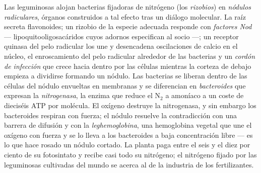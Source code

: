 \begin{definition}\label{def:b3:microbiomes:nodule}
Las leguminosas alojan bacterias fijadoras de nitrógeno (los
\emph{rizobios}) en \emph{nódulos radiculares}, órganos construidos a tal
efecto tras un diálogo molecular. La raíz secreta flavonoides; un rizobio
de la especie adecuada responde con \emph{factores Nod} ---
lipoquitooligosacáridos cuyos adornos especifican al socio ---; un
receptor quinasa del pelo radicular los une y desencadena oscilaciones de
calcio en el núcleo, el enroscamiento del pelo radicular alrededor de las
bacterias y un \emph{cordón de infección} que crece hacia dentro por las
células mientras la corteza de debajo empieza a dividirse formando un
nódulo. Las bacterias se liberan dentro de las células del nódulo
envueltas en membranas y se diferencian en \emph{bacteroides} que
expresan la \emph{nitrogenasa}, la enzima que reduce el N$_{2}$ a amoníaco
a un coste de dieciséis ATP por molécula. El oxígeno destruye la
nitrogenasa, y sin embargo los bacteroides respiran con fuerza; el nódulo
resuelve la contradicción con una barrera de difusión y con la
\emph{leghemoglobina}, una hemoglobina vegetal que une el oxígeno con
fuerza y se lo lleva a los bacteroides a baja concentración libre --- es
lo que hace rosado un nódulo cortado. La planta paga entre el seis y el
diez por ciento de su fotosintato y recibe casi todo su nitrógeno; el
nitrógeno fijado por las leguminosas cultivadas del mundo se acerca al de
la industria de los fertilizantes.
\end{definition}

